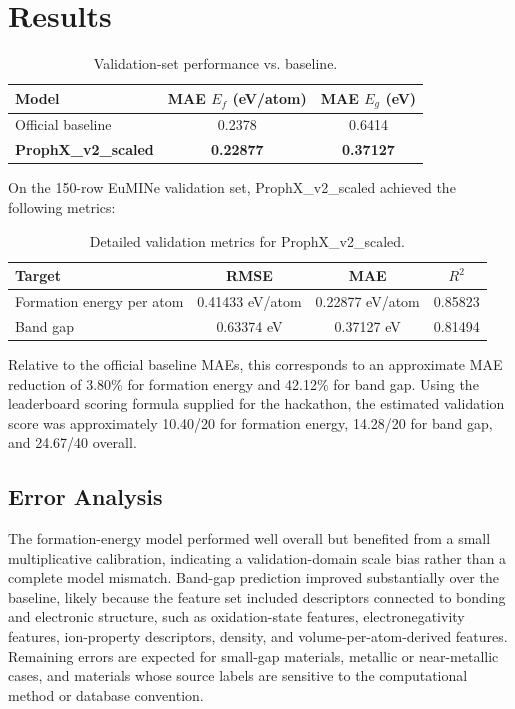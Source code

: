 \documentclass[10pt, a4paper]{article}
\begin{document}
\section{Results}

\begin{table}[h!]
\centering
\caption{Validation-set performance vs. baseline.}
\label{tab:results}
\begin{tabular}{@{}lcc@{}}
\toprule
Model & MAE $E_f$ (eV/atom) & MAE $E_g$ (eV) \\
\midrule
Official baseline & 0.2378 & 0.6414 \\
\textbf{ProphX\_v2\_scaled} & \textbf{0.22877} & \textbf{0.37127} \\
\bottomrule
\end{tabular}
\end{table}

On the 150-row EuMINe validation set, ProphX\_v2\_scaled achieved the following metrics:

\begin{table}[h!]
\centering
\caption{Detailed validation metrics for ProphX\_v2\_scaled.}
\label{tab:detailed_results}
\begin{tabular}{@{}lccc@{}}
\toprule
Target & RMSE & MAE & $R^2$ \\
\midrule
Formation energy per atom & 0.41433 eV/atom & 0.22877 eV/atom & 0.85823 \\
Band gap & 0.63374 eV & 0.37127 eV & 0.81494 \\
\bottomrule
\end{tabular}
\end{table}

Relative to the official baseline MAEs, this corresponds to an approximate MAE reduction of 3.80\% for formation energy and 42.12\% for band gap. Using the leaderboard scoring formula supplied for the hackathon, the estimated validation score was approximately 10.40/20 for formation energy, 14.28/20 for band gap, and 24.67/40 overall.

\subsection{Error Analysis}
The formation-energy model performed well overall but benefited from a small multiplicative calibration, indicating a validation-domain scale bias rather than a complete model mismatch. Band-gap prediction improved substantially over the baseline, likely because the feature set included descriptors connected to bonding and electronic structure, such as oxidation-state features, electronegativity features, ion-property descriptors, density, and volume-per-atom-derived features. Remaining errors are expected for small-gap materials, metallic or near-metallic cases, and materials whose source labels are sensitive to the computational method or database convention.
\end{document}
